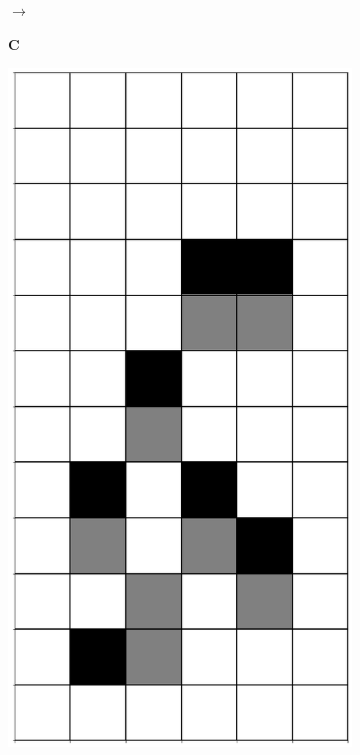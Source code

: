 \documentclass[12pt]{article}
\numberwithin{figure}{section} %
\begin{document}
\begin{figure}[H]
\begin{subfigure}{0.3\textwidth}
     		\subcaption{}
   	\end{subfigure}
	\begin{subfigure}[t]{0.03\textwidth}
      		{\LARGE$\xrightarrow{}$}
	\end{subfigure}
      	\newline
   	\setcounter{subfigure}{0}
     	\begin{subfigure}[t]{0.03\textwidth}
    		\textbf{C}
  	\end{subfigure}	
      	\begin{subfigure}{0.3\textwidth}
    		\centering
     		\includegraphics[angle=270,width=\linewidth]{Section4/5.0}

\end{subfigure}
\end{figure}
\end{document}
